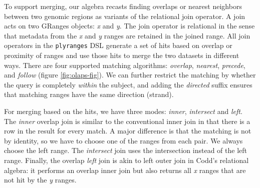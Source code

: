 \documentclass[]{article}
\begin{document}
To support merging, our algebra recasts finding overlaps or nearest
neighbors between two genomic regions as variants of the relational join
operator. A join acts on two GRanges objects: \emph{x} and \emph{y}. The
join operator is relational in the sense that metadata from the \emph{x}
and \emph{y} ranges are retained in the joined range. All join operators
in the \texttt{plyranges} DSL generate a set of hits based on overlap or
proximity of ranges and use those hits to merge the two datasets in
different ways. There are four supported matching algorithms:
\emph{overlap}, \emph{nearest}, \emph{precede}, and \emph{follow}
(figure \ref{fig:olaps-fig}). We can further restrict the matching by
whether the query is completely \emph{within} the subject, and adding
the \emph{directed} suffix ensures that matching ranges have the same
direction (strand).

For merging based on the hits, we have three modes: \emph{inner},
\emph{intersect} and \emph{left}. The \emph{inner} overlap join is
similar to the conventional inner join in that there is a row in the
result for every match. A major difference is that the matching is not
by identity, so we have to choose one of the ranges from each pair. We
always choose the left range. The \emph{intersect} join uses the
intersection instead of the left range. Finally, the overlap \emph{left}
join is akin to left outer join in Codd's relational algebra: it
performs an overlap inner join but also returns all \emph{x} ranges that
are not hit by the \emph{y} ranges.
\end{document}
